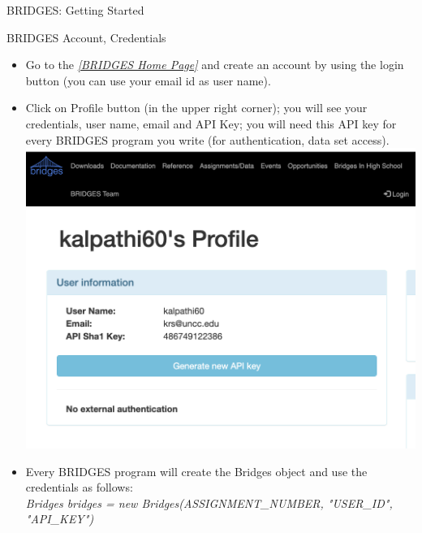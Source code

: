 \documentclass[aspectratio=169]{beamer}
\begin{document}
\begin{frame}{BRIDGES: Getting Started}
\begin{block}{BRIDGES Account, Credentials}
\begin{itemize}
	\item Go to the \href{http://bridgesuncc.github.io/}{\color{purple}\textsl{[BRIDGES Home Page]}} and create an account by using the login button (you can use your email id as user name).
	\item Click on Profile button (in the upper right corner); you will see 
	your credentials, user name, email and  API Key; you will need this API 
	key for every BRIDGES program you write (for authentication, data set access). 
	{\center
  \includegraphics[width=.6\linewidth]{fig/login.png}
  \includegraphics[width=.3\linewidth]{fig/profile.png}}

	\item Every BRIDGES program will create the Bridges object and use the 
		credentials as follows:\\
	\textsl{Bridges bridges = new Bridges(ASSIGNMENT\_NUMBER, "USER\_ID", "API\_KEY")}
\end{itemize}
\end{block}
\end{frame}
\end{document}
